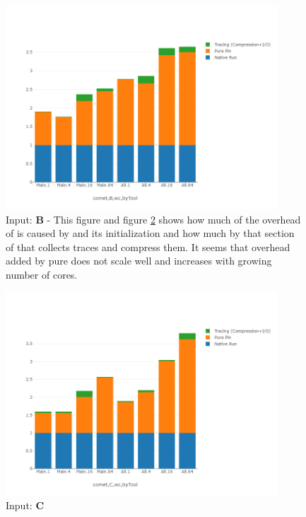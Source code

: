 

\begin{figure}[!t]
\centering
\includegraphics[width=4in]{figs.comet.newMed/comet_chartDet_B_wc_byTool_p3_5.png}
\caption{ Input: \textbf{B} - This figure and figure \ref{comet_chartDet_C_wc_byTool_p3_5} shows how much of the overhead of \parlot is caused by \pin and its initialization and how much by that section of \parlot that collects traces and compress them. It seems that overhead added by pure \pin does not scale well and increases with growing number of cores.
}
\label{comet_chartDet_B_wc_byTool_p3_5}
\end{figure}


\begin{figure}[!t]
\centering
\includegraphics[width=4in]{figs.comet.newMed/comet_chartDet_C_wc_byTool_p3_5.png}
\caption{ Input: \textbf{C}
}
\label{comet_chartDet_C_wc_byTool_p3_5}
\end{figure}






